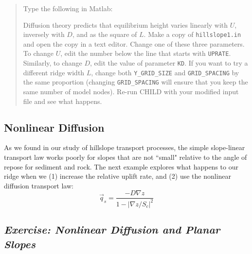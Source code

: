 \documentclass[12pt,reqno]{amsart}
\begin{document}
\begin{quote}
{%
Type the following in Matlab:
Diffusion theory predicts that equilibrium height varies linearly with $U$, inversely with $D$, and as the square of $L$. Make a copy of {\tt hillslope1.in} and open the copy in a text editor. Change one of these three parameters. To change $U$, edit the number below the line that starts with {\tt UPRATE}. Similarly, to change $D$, edit the value of parameter {\tt KD}. If you want to try a different ridge width $L$, change both {\tt Y\_GRID\_SIZE} and {\tt GRID\_SPACING} by the same proportion (changing {\tt GRID\_SPACING} will ensure that you keep the same number of model nodes). Re-run CHILD with your modified input file and see what happens.
}
\end{quote}

\subsection{Nonlinear Diffusion}

As we found in our study of hillslope transport processes, the simple slope-linear transport law works poorly for slopes that are not ``small" relative to the angle of repose for sediment and rock. The next example explores what happens to our ridge when we (1) increase the relative uplift rate, and (2) use the nonlinear diffusion transport law:
\begin{equation}
\vec{q}_s = \frac{-D \nabla z}{1-|\nabla z/S_c|^2}
\end{equation}

\subsection*{\em Exercise: Nonlinear Diffusion and Planar Slopes}
\end{document}
